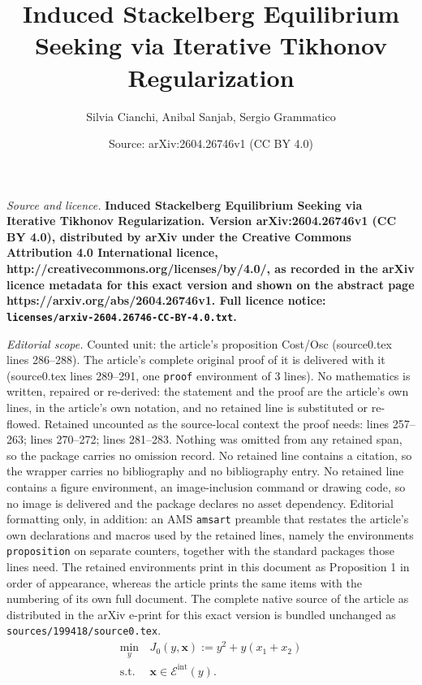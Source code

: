 \documentclass[10pt,a4paper]{amsart}
\title{\LARGE \bf Induced Stackelberg Equilibrium Seeking via Iterative Tikhonov Regularization}
\author{Silvia Cianchi, Anibal Sanjab, Sergio Grammatico}
\date{Source: arXiv:2604.26746v1 (CC BY 4.0)}
\newcommand\xbf{\mathbf{x}}
\begin{document}
\maketitle

\noindent\emph{Source and licence.} \LARGE \bf Induced Stackelberg Equilibrium Seeking via Iterative Tikhonov Regularization. Version arXiv:2604.26746v1 (CC BY 4.0), distributed by arXiv under the Creative Commons Attribution 4.0 International licence, http://creativecommons.org/licenses/by/4.0/, as recorded in the arXiv licence metadata for this exact version and shown on the abstract page https://arxiv.org/abs/2604.26746v1. Full licence notice: \texttt{licenses/arxiv-2604.26746-CC-BY-4.0.txt}.\par\smallskip

\noindent\textit{Editorial scope.} Counted unit: the article's proposition Cost/Osc (source0.tex lines 286--288). The article's complete original proof of it is delivered with it (source0.tex lines 289--291, one \texttt{proof} environment of 3 lines). No mathematics is written, repaired or re-derived: the statement and the proof are the article's own lines, in the article's own notation, and no retained line is substituted or re-flowed.  Retained uncounted as the source-local context the proof needs: lines 257--263; lines 270--272; lines 281--283.  Nothing was omitted from any retained span, so the package carries no omission record.  No retained line contains a citation, so the wrapper carries no bibliography and no bibliography entry.  No retained line contains a figure environment, an image-inclusion command or drawing code, so no image is delivered and the package declares no asset dependency.  Editorial formatting only, in addition: an AMS \texttt{amsart} preamble that restates the article's own declarations and macros used by the retained lines, namely the environments \texttt{proposition} on separate counters, together with the standard packages those lines need.  The retained environments print in this document as Proposition 1 in order of appearance, whereas the article prints the same items with the numbering of its own full document.  The complete native source of the article as distributed in the arXiv e-print for this exact version is bundled unchanged as \texttt{sources/199418/source0.tex}.
\begin{equation}\label{Stackelberg-ILL}
\begin{aligned}
\underset{y} {\min} \, & J_0(y,\xbf):=y^2+y(x_1+x_2)
\\
\mathrm{s. t.} \, \,  &\xbf\in \mathcal{E}^\mathrm{int}(y).
\end{aligned}
\end{equation}
\end{document}
